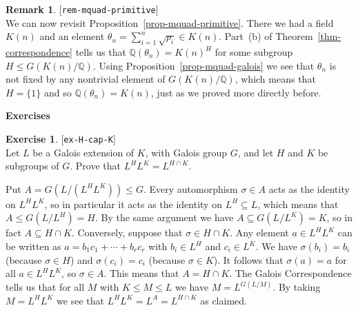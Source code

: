 \documentclass{amsart}
\newcommand{\lbl}[1]{\label{#1}\textup{[\texttt{#1}]}\ \\}
\newcommand{\lbl}{\label}
\newcommand{\Q}         {{\mathbb{Q}}}
\newcommand{\tht}       {\theta}
\newcommand{\sg}        {\sigma}
\newcommand{\sse}       {\subseteq}
\renewcommand{\:}{\colon}
\newcommand{\lastexlabel}{}
\newcommand{\exlabel}[1]{
 \global\def\lastexlabel{#1}\label{#1}[\texttt{#1}]\ \\
}
\newcommand{\exlabel}[1]{
 \global\def\lastexlabel{#1}\label{#1}
}
\newenvironment{solution}{\SolutionInline}{\endSolutionInline}
\theoremstyle{definition}
\newtheorem{remark}[theorem]{Remark}
\newtheorem{exercise}{Exercise}[section]
\renewenvironment{solution}{\SolutionAtEnd}{\endSolutionAtEnd}
\begin{document}
\begin{remark}\lbl{rem-mquad-primitive}
 We can now revisit Proposition~\ref{prop-mquad-primitive}.  There we
 had a field $K(n)$ and an element
 $\tht_n=\sum_{i=1}^n\sqrt{p_i}\in K(n)$.  Part~(b) of
 Theorem~\ref{thm-correspondence} tells us that $\Q(\tht_n)=K(n)^H$ for
 some subgroup $H\leq G(K(n)/\Q)$.  Using
 Proposition~\ref{prop-mquad-galois} we see that $\tht_n$ is not fixed 
 by any nontrivial element of $G(K(n)/\Q)$, which means that $H=\{1\}$
 and so $\Q(\tht_n)=K(n)$, just as we proved more directly before.
\end{remark}


\begin{center}
 \Large \textbf{Exercises}
\end{center}

\begin{exercise}\exlabel{ex-H-cap-K}
 Let $L$ be a Galois extension of $K$, with Galois group $G$, and let
 $H$ and $K$ be subgroups of $G$.  Prove that $L^HL^K=L^{H\cap K}$.  
\end{exercise}
\begin{solution}
 Put $A=G(L/(L^HL^K))\leq G$.  Every automorphism $\sg\in A$ acts as
 the identity on $L^HL^K$, so in particular it acts as the identity on
 $L^H\sse L$, which means that $A\leq G(L/L^H)=H$.  By the same
 argument we have $A\sse G(L/L^K)=K$, so in fact $A\sse H\cap K$.
 Conversely, suppose that $\sg\in H\cap K$.  Any element $a\in L^HL^K$
 can be written as $a=b_1c_1+\dotsb+b_rc_r$ with $b_i\in L^H$ and
 $c_i\in L^K$.  We have $\sg(b_i)=b_i$ (because $\sg\in H$) and
 $\sg(c_i)=c_i$ (because $\sg\in K$).  It follows that $\sg(a)=a$ for
 all $a\in L^HL^K$, so $\sg\in A$.  This means that $A=H\cap K$.  The
 Galois Correspondence tells us that for all $M$ with $K\leq M\leq L$
 we have $M=L^{G(L/M)}$.  By taking $M=L^HL^K$ we see that
 $L^HL^K=L^A=L^{H\cap K}$ as claimed.
\end{solution}
\end{document}
